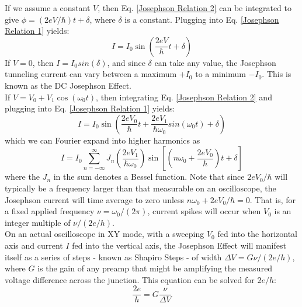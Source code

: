 \documentclass[a4paper,12pt]{article}
\begin{document}
\hspace*{5 mm} If we assume a constant $V$, then Eq. \ref{Josephson Relation 2} can be integrated to give $\phi=(2e V/\hbar)t+\delta$, where $\delta$ is a constant.  Plugging into Eq. \ref{Josephson Relation 1} yields:
\begin{equation}
I=I_0 \sin\left( \frac{2e V}{\hbar}t + \delta \right)
\end{equation}
If $V=0$, then $I=I_0 sin(\delta)$, and since $\delta$ can take any value, the Josephson tunneling current can vary between a maximum $+I_0$ to a minimum $-I_0$.  This is known as the DC Josephson Effect. \\
\hspace*{5 mm} If $V=V_0+V_1\cos(\omega_0 t)$, then integrating Eq. \ref{Josephson Relation 2} and plugging into Eq. \ref{Josephson Relation 1} yields:
\begin{equation}
I=I_0 \sin \left( \frac{2eV_0}{\hbar} t + \frac{2eV_1}{\hbar \omega_0} sin(\omega_0 t)+\delta \right)
\end{equation}
which we can Fourier expand into higher harmonics as
\begin{equation}
I=I_0 \sum_{n=-\infty}^{\infty} J_n \left( \frac{2eV_1}{\hbar \omega_0} \right) \sin \left[ \left( n \omega_0+\frac{2eV_0}{\hbar} \right) t+\delta \right]
\end{equation}
where the $J_n$ in the sum denotes a Bessel function.  Note that since $2eV_0/\hbar$ will typically be a frequency larger than that measurable on an oscilloscope, the Josephson current will time average to zero unless $n \omega_0 + 2eV_0/\hbar=0$.  That is, for a fixed applied frequency $\nu=\omega_0/(2\pi)$, current spikes will occur when $V_0$ is an integer multiple of $\nu/(2e/h)$. \\
\hspace*{5 mm} On an actual oscilloscope in XY mode, with a sweeping $V_0$ fed into the horizontal axis and current $I$ fed into the vertical axis, the Josephson Effect will manifest itself as a series of steps - known as Shapiro Steps - of width $\Delta V=G \nu/(2e/h)$, where $G$ is the gain of any preamp that might be amplifying the measured voltage difference across the junction.  This equation can be solved for $2e/h$:
\begin{equation}\label{2e/h relation}
\frac{2e}{h}=G \frac{\nu}{\Delta V}
\end{equation}
\end{document}
